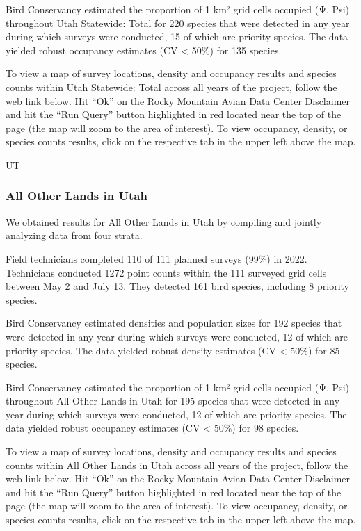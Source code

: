 \documentclass[
  letterpaper,
  DIV=11,
  numbers=noendperiod,
  oneside]{scrreprt}
\begin{document}
Bird Conservancy estimated the proportion of 1 km² grid cells occupied
(Ψ, Psi) throughout Utah Statewide: Total for 220 species that were
detected in any year during which surveys were conducted, 15 of which
are priority species. The data yielded robust occupancy estimates (CV
\textless{} 50\%) for 135 species.

To view a map of survey locations, density and occupancy results and
species counts within Utah Statewide: Total across all years of the
project, follow the web link below. Hit ``Ok'' on the Rocky Mountain
Avian Data Center Disclaimer and hit the ``Run Query'' button
highlighted in red located near the top of the page (the map will zoom
to the area of interest). To view occupancy, density, or species counts
results, click on the respective tab in the upper left above the map.

\href{http://www.rmbo.org/new_site/adc/QueryWindow.aspx\#N4IgzgrgDgpgTmALnAhoiBbEAuABCAVQBUQBfIA=}{UT}

\hypertarget{all-other-lands-in-utah}{%
\subsubsection{All Other Lands in Utah}\label{all-other-lands-in-utah}}

We obtained results for All Other Lands in Utah by compiling and jointly
analyzing data from four strata.

Field technicians completed 110 of 111 planned surveys (99\%) in 2022.
Technicians conducted 1272 point counts within the 111 surveyed grid
cells between May 2 and July 13. They detected 161 bird species,
including 8 priority species.

Bird Conservancy estimated densities and population sizes for 192
species that were detected in any year during which surveys were
conducted, 12 of which are priority species. The data yielded robust
density estimates (CV \textless{} 50\%) for 85 species.

Bird Conservancy estimated the proportion of 1 km² grid cells occupied
(Ψ, Psi) throughout All Other Lands in Utah for 195 species that were
detected in any year during which surveys were conducted, 12 of which
are priority species. The data yielded robust occupancy estimates (CV
\textless{} 50\%) for 98 species.

To view a map of survey locations, density and occupancy results and
species counts within All Other Lands in Utah across all years of the
project, follow the web link below. Hit ``Ok'' on the Rocky Mountain
Avian Data Center Disclaimer and hit the ``Run Query'' button
highlighted in red located near the top of the page (the map will zoom
to the area of interest). To view occupancy, density, or species counts
results, click on the respective tab in the upper left above the map.
\end{document}
